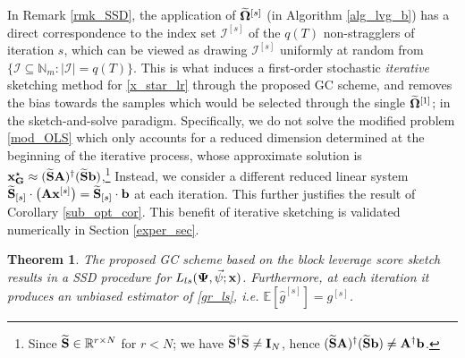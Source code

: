 \documentclass[journal,letterpaper,onecolumn,twoside,nofonttune]{IEEEtran}
\newcommand{\N}{\mathbb{N}}
\newcommand{\R}{\mathbb{R}}
\newcommand{\E}{\mathbb{E}}
\newcommand{\I}{\mathcal{I}}
\newcommand{\Scal}{\mathcal{S}}
\newcommand{\bb}{\bold{b}}
\newcommand{\xb}{\bold{x}}
\newcommand{\Ab}{\bold{A}}
\newcommand{\Gb}{\bold{G}}
\newcommand{\Ib}{\bold{I}}
\newcommand{\Sb}{\bold{S}}
\newcommand{\Sbwt}{\widetilde{\Sb}}
\newcommand{\gh}{\hat{g}}
\newcommand{\Omb}{\bold{\Omega}}
\newcommand{\Ombwt}{\widetilde{\Omb}}
\newcommand{\PsiB}{\bold{\Psi}}
\newcommand{\psiv}{\vec{\psi}}
\newtheorem{Thm}{Theorem}
\newcommand{\ind}{\text{\color{white}.$\quad$}}
\begin{document}
In Remark \ref{rmk_SSD}, the application of $\Ombwt^{[s]}$ (in Algorithm \ref{alg_lvg_b}) has a direct correspondence to the index set $\I^{[s]}$ of the $q(T)$ non-stragglers of iteration $s$, which can be viewed as drawing  $\I^{[s]}$ uniformly at random from $\{\I\subseteq\N_m:|\I|=q(T)\}$. This is what induces a first-order stochastic \textit{iterative} sketching method for \eqref{x_star_lr} through the proposed GC scheme, and removes the bias towards the samples which would be selected through the single $\Ombwt^{[1]}$; in the sketch-and-solve paradigm. Specifically, we do not solve the modified problem \eqref{mod_OLS} which only accounts for a reduced dimension determined at the beginning of the iterative process, whose approximate solution is $\xb_\Gb^\star\approx(\Sbwt\Ab)^{\dagger}(\Sbwt\bb)$,\footnote{Since $\Sbwt\in\R^{r\times N}$ for $r<N$; we have $\Sbwt^{\dagger}\Sbwt\neq\Ib_N$, hence $(\Sbwt\Ab)^{\dagger}(\Sbwt\bb)\neq\Ab^{\dagger}\bb$.} Instead, we consider a different reduced linear system $\Sbwt_{[s]}\cdot\left(\Ab\xb^{[s]}\right)=\Sbwt_{[s]}\cdot\bb$ at each iteration. This further justifies the result of Corollary \ref{sub_opt_cor}. This benefit of iterative sketching is validated numerically in Section \ref{exper_sec}.

\begin{Thm}
\label{SGD_nonunif_thm}
The proposed GC scheme based on the block leverage score sketch results in a SSD procedure for $L_{ls}(\PsiB,\psiv;\xb)$. Furthermore, at each iteration it produces an unbiased estimator of \eqref{gr_ls}, \textit{i.e.} $\E\left[\gh^{[s]}\right]=g^{[s]}$.%
\end{Thm}
\end{document}
